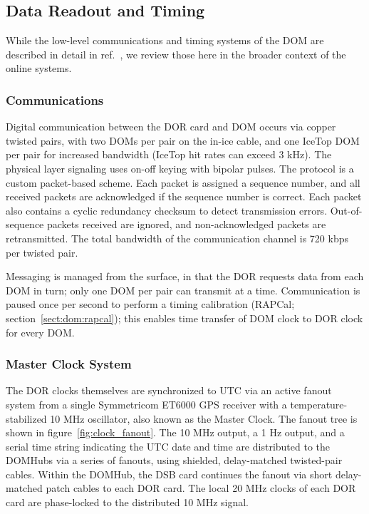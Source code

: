 \subsection{Data Readout and Timing}

While the low-level communications and timing systems of the DOM are
described in detail in ref.~\cite{ICECUBE:DAQ}, we review those here in
the broader context of the online systems.

\subsubsection{\label{sect:online:comms}Communications}

Digital communication between the DOR card and DOM occurs via copper
twisted pairs, with two DOMs per pair on the in-ice cable, and one IceTop
DOM per pair for increased bandwidth (IceTop hit rates can exceed 3 kHz).
The physical layer signaling uses on-off keying with bipolar pulses.  The
protocol is a custom 
packet-based scheme.  Each packet is assigned a sequence number, and all
received packets are acknowledged if the sequence number is correct.  Each
packet also contains a cyclic redundancy checksum to detect transmission errors.
Out-of-sequence packets received are ignored, and non-acknowledged packets
are retransmitted. The total bandwidth of the communication channel
is 720 kbps per twisted pair.

Messaging is managed from the surface, in that the DOR requests data from
each DOM in turn; only one DOM per pair can transmit at a time.  Communication is
paused once per second to perform a timing calibration (RAPCal; section~\ref{sect:dom:rapcal}); this enables time transfer of DOM clock to DOR
clock for every DOM.  

\subsubsection{\label{sect:online:master_clock}Master Clock System}

The DOR clocks themselves are synchronized to UTC via an active fanout
system from a single Symmetricom ET6000 GPS receiver with a
temperature-stabilized 10 MHz oscillator, also known as the Master
Clock. The fanout tree is shown in
figure~\ref{fig:clock_fanout}. The 10 MHz output, a 1 Hz output, and a
serial time string indicating
the UTC date and time are distributed to the DOMHubs via a series of
fanouts, using shielded, delay-matched twisted-pair cables.  Within the
DOMHub, the DSB card continues the fanout via short delay-matched patch
cables to each DOR card.  The local 20 MHz clocks of each DOR card are
phase-locked to the distributed 10 MHz signal.  

